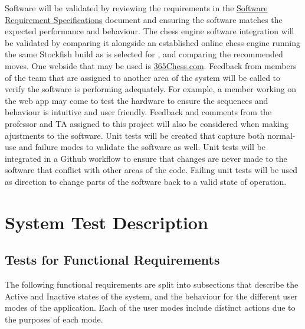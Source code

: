 \documentclass[12pt, titlepage]{article}
\begin{document}
Software will be validated by reviewing the requirements in the \href{file:../SRS/SRS.pdf}{Software Requirement Specifications} document and ensuring the software matches the expected performance and behaviour. The chess engine software integration will be validated by comparing it alongside an established online chess engine running the same Stockfish build as is selected for \progname{}, and comparing the recommended moves. One webside that may be used is \href{https://www.365chess.com/analysis_board.php}{365Chess.com}.
\newline
\newline
Feedback from members of the team that are assigned to another area of the system will be called to verify the software is performing adequately. For example, a member working on the web app may come to test the hardware to ensure the sequences and behaviour is intuitive and user friendly. Feedback and comments from the professor and TA assigned to this project will also be considered when making ajustments to the software.
\newline
\newline
Unit tests will be created that capture both normal-use and failure modes to validate the software as well. Unit tests will be integrated in a Github workflow to ensure that changes are never made to the software that conflict with other areas of the code. Failing unit tests will be used as direction to change parts of the software back to a valid state of operation.




\section{System Test Description} \label{SystemTests}
	
\subsection{Tests for Functional Requirements}

The following functional requirements are split into subsections 
that describe the Active and Inactive states of the
system, and the behaviour for the different user modes of the application.
Each of the user modes include distinct actions due to the purposes of each mode. 
\end{document}
